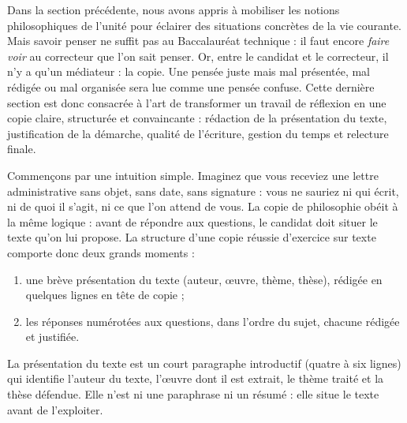 \documentclass[11pt]{article}
\newcommand{\cle}[1]{{\popxbold\color{popdark}#1}}
\newcounter{popsec}
\newcounter{popsub}
\newcommand{\courssub}[1]{%
  \stepcounter{popsub}%
  \par\vspace{9pt}\noindent{\popxbold\fontsize{11.5}{13}\selectfont\color{popink}{\color{poporange}\thepopsec.\thepopsub}\hspace{6pt}#1}\par\nopagebreak\vspace{4pt}
}
\begin{document}
Dans la section précédente, nous avons appris à mobiliser les notions philosophiques de l'unité pour éclairer des situations concrètes de la vie courante. Mais savoir penser ne suffit pas au Baccalauréat technique : il faut encore \emph{faire voir} au correcteur que l'on sait penser. Or, entre le candidat et le correcteur, il n'y a qu'un médiateur : la copie. Une pensée juste mais mal présentée, mal rédigée ou mal organisée sera lue comme une pensée confuse. Cette dernière section est donc consacrée à l'art de transformer un travail de réflexion en une copie claire, structurée et convaincante : rédaction de la présentation du texte, justification de la démarche, qualité de l'écriture, gestion du temps et relecture finale.

\courssub{La structure globale de la copie}

Commençons par une intuition simple. Imaginez que vous receviez une lettre administrative sans objet, sans date, sans signature : vous ne sauriez ni qui écrit, ni de quoi il s'agit, ni ce que l'on attend de vous. La copie de philosophie obéit à la même logique : avant de répondre aux questions, le candidat doit \cle{situer} le texte qu'on lui propose. La structure d'une copie réussie d'exercice sur texte comporte donc deux grands moments :

\begin{enumerate}
\item une \cle{brève présentation du texte} (auteur, œuvre, thème, thèse), rédigée en quelques lignes en tête de copie ;
\item les \cle{réponses numérotées} aux questions, dans l'ordre du sujet, chacune rédigée et justifiée.
\end{enumerate}

\begin{definition}
La présentation du texte est un court paragraphe introductif (quatre à six lignes) qui identifie l'auteur du texte, l'œuvre dont il est extrait, le thème traité et la thèse défendue. Elle n'est ni une paraphrase ni un résumé : elle situe le texte avant de l'exploiter.
\end{definition}
\end{document}
